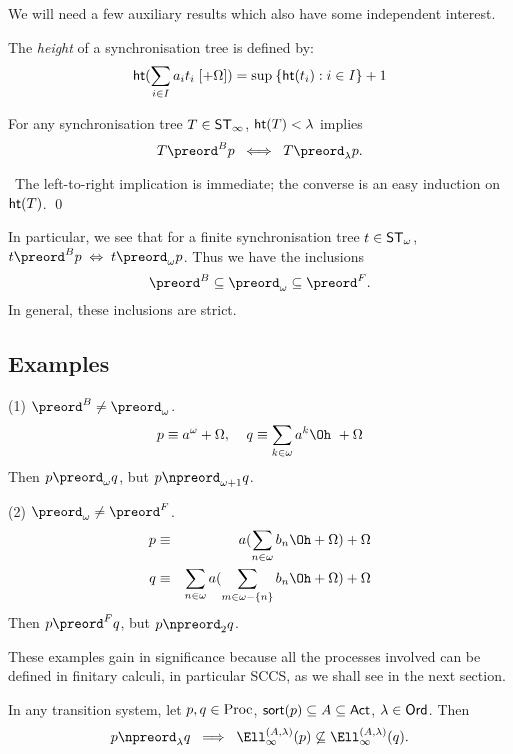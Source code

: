 We will need a few auxiliary results which also have some independent interest.
\begin{definition}
{\rm The {\em height} of a synchronisation tree is defined by:}
\[ {\sf ht}(\sum_{i \in I} a_{i}t_{i} \; [+ \Omega ] ) = \sup \: \{ {\sf ht}(t_{i}) : i \in I \} + 1 \]
\end{definition}

\begin{lemma}
\label{htl}
For any synchronisation tree $T \in {\sf ST}_{\infty}$, ${\sf ht}(T) < \lambda$ implies
\[ T \preord^{B} p \;\; \Longleftrightarrow \;\; T \preord_{\lambda} p . \]
\end{lemma}

\proof\ The left-to-right implication is immediate; the converse is an easy induction on ${\sf ht}(T)$. \qed

In particular, we see that for a finite synchronisation tree $t \in {\sf ST}_{\omega}$, $t \preord^{B} p \; \Leftrightarrow \; t\preord_{\omega} p$.  
Thus we have the inclusions
\[ {\preord^{B}} \subseteq {\preord_{\omega}} \subseteq {\preord^{F}} . \]
In general, these inclusions are strict.
\subsection*{Examples}
(1) ${\preord^{B}} \not= {\preord_{\omega}}$.
\[ p \equiv a^{\omega} + \Omega , \;\;\;\; q \equiv \sum_{k \in \omega} a^{k} \Oh\ + \Omega \]
Then $p \preord_{\omega} q$, but $p \npreord_{\omega + 1} q$.

\noindent (2) ${\preord_{\omega}} \not= {\preord^{F}}$.
\begin{eqnarray*}
p & \equiv & a( \sum_{n \in \omega} b_{n} \Oh + \Omega ) + \Omega \\
q & \equiv & \sum_{n \in \omega} a(\sum_{m \in \omega - \{ n \} } b_{n} \Oh + \Omega ) + \Omega
\end{eqnarray*}
Then $p \preord^{F} q$, but $p \npreord_{2} q$.

These examples gain in significance because all the processes involved can be defined in finitary calculi, in particular SCCS, as we shall see in the next section.

\begin{lemma}
\label{stl}
In any transition system, let $p, q \in {\rm Proc}$, ${\sf sort}(p) \subseteq A \subseteq {\sf Act}$, $\lambda \in {\sf Ord}$. Then
\[ p \npreord_{\lambda} q \;\; \Longrightarrow \;\; {\Ell}^{(A, \lambda )}_{\infty}(p) \not\subseteq {\Ell}^{(A, \lambda )}_{\infty}(q) . \]
\end{lemma}

